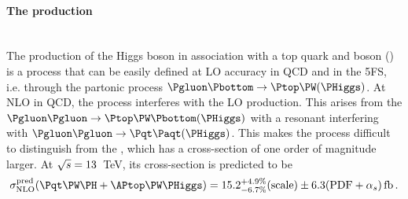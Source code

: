 \vspace{1 cm}
\paragraph{The \tWH production}\mbox{}\\

The production of the Higgs boson in association with a top quark and \PW boson
(\tWH) is a process that can be easily defined at LO accuracy in QCD and in the 5FS, i.e. 
through the partonic process $\Pgluon \Pbottom \rightarrow \Ptop \PW (\PHiggs)$\cite{Demartin:2016axk}.
At NLO in QCD, the \tWH process interferes with the LO \ttH production.
This arises from the $\Pgluon \Pgluon \rightarrow \Ptop \PW \Pbottom (\PHiggs)$
with a resonant \APtop interfering with $\Pgluon \Pgluon \rightarrow \ttbar (\PHiggs)$.
This makes the \tWH process difficult to distinguish from the \ttH, which has a 
cross-section of one order of magnitude larger. 
At $\sqrt{s}=13$~TeV, its cross-section is predicted to be
\begin{equation*}
	\sigma_{\text{NLO}}^{\text{pred}} (\tWH + \APtop\PW\PHiggs) = 15.2^{+4.9\%}_{-6.7\%}(\text{scale}) \pm 6.3 (\text{PDF}+\alpha_{s}) \,\text{fb}\,.
\end{equation*}


\begin{comment}
\begin{figure}
\centering
\begin{subfigure}{.4\textwidth}
  \centering
  \texttt{[image: Chapter1/tW\_A]}
  \caption{}
  \label{fig:Chap1:tH:tWH:A}
\end{subfigure}%
\begin{subfigure}{.4\textwidth}
  \centering
  \texttt{[image: Chapter1/tW\_B]}
  \caption{}
  \label{fig:Chap1:tH:tWH:B}
\end{subfigure}%
\caption{LO Feynman diagrams for \tW production in the 5FS.}
\label{fig:Chap1:tH:tW}
\end{figure}
\end{comment}

